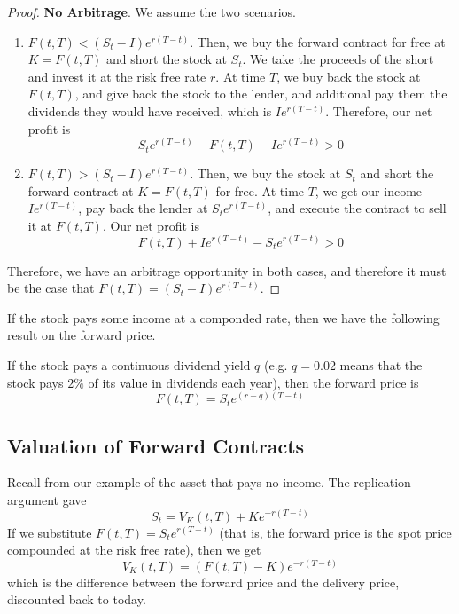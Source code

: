 \documentclass{article}
\begin{document}
    \begin{proof}
      \textbf{No Arbitrage}. We assume the two scenarios. 
      \begin{enumerate}
        \item $F(t, T) < (S_t - I) e^{r(T - t)}$. Then, we buy the forward contract for free at $K = F(t, T)$ and short the stock at $S_t$. We take the proceeds of the short and invest it at the risk free rate $r$. At time $T$, we buy back the stock at $F(t, T)$, and give back the stock to the lender, and additional pay them the dividends they would have received, which is $I e^{r(T - t)}$. Therefore, our net profit is
          \begin{equation}
            S_t e^{r(T - t)} - F(t, T) - I e^{r(T - t)} > 0
          \end{equation}
        \item $F(t, T) > (S_t - I) e^{r(T - t)}$. Then, we buy the stock at $S_t$ and short the forward contract at $K = F(t, T)$ for free. At time $T$, we get our income $I e^{r(T - t)}$, pay back the lender at $S_t e^{r(T - t)}$, and execute the contract to sell it at $F(t, T)$. Our net profit is 
          \begin{equation}
            F(t, T) + I e^{r(T - t)} - S_t e^{r(T - t)} > 0
          \end{equation}
      \end{enumerate}
      Therefore, we have an arbitrage opportunity in both cases, and therefore it must be the case that $F(t, T) = (S_t - I) e^{r(T - t)}$.
    \end{proof}

    If the stock pays some income at a componded rate, then we have the following result on the forward price. 

    \begin{theorem}
      If the stock pays a continuous dividend yield $q$ (e.g. $q = 0.02$ means that the stock pays $2\%$ of its value in dividends each year), then the forward price is 
      \begin{equation}
        F(t, T) = S_t e^{(r - q)(T - t)}
      \end{equation}
    \end{theorem}

  \subsection{Valuation of Forward Contracts}

    Recall from our example of the asset that pays no income. The replication argument gave 
    \begin{equation}
      S_t = V_K (t, T) + K e^{-r (T - t)}
    \end{equation}
    If we substitute $F(t, T) = S_t e^{r (T -t)}$ (that is, the forward price is the spot price compounded at the risk free rate), then we get
    \begin{equation}
      V_K (t, T) = (F(t, T) - K) e^{-r (T - t)} 
    \end{equation}
    which is the difference between the forward price and the delivery price, discounted back to today. 
\end{document}
